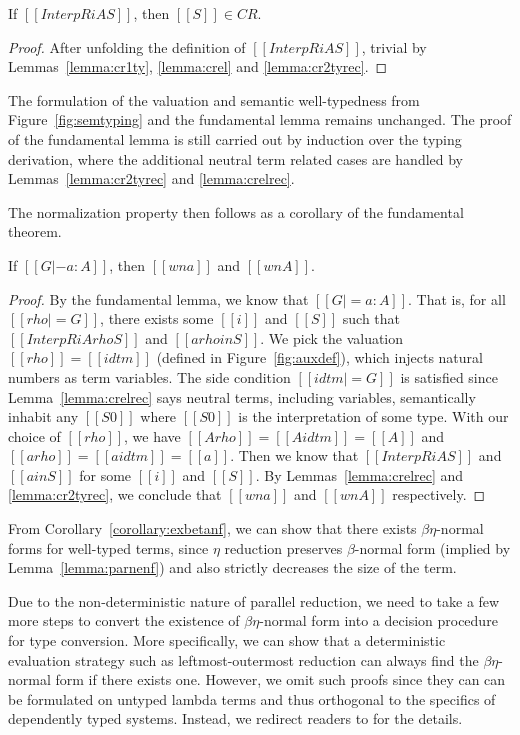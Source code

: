 \documentclass[acmsmall]{acmart}
\begin{document}
\begin{lemma}
  \label{lemma:crelrec}
  If $[[InterpR i A S]]$, then $[[S]] \in CR$.
\end{lemma}
\begin{proof}
  After unfolding the definition of $[[InterpR i A S]]$, trivial by
  Lemmas~\ref{lemma:cr1ty}, \ref{lemma:crel} and \ref{lemma:cr2tyrec}.
\end{proof}

The formulation of the valuation and semantic well-typedness from
Figure~\ref{fig:semtyping} and the fundamental lemma remains
unchanged.
The proof of the fundamental lemma is still carried out by induction
over the typing derivation, where the additional neutral term related
cases are handled by Lemmas~\ref{lemma:cr2tyrec} and
\ref{lemma:crelrec}.

The normalization property then follows as a corollary of the
fundamental theorem.
\begin{corollary}
  \label{corollary:exbetanf}
  If $[[G |- a : A]]$, then $[[wn a]]$ and $[[wn A]]$.
\end{corollary}
\begin{proof}
  By the fundamental lemma, we know that $[[G |= a : A]]$. That is,
  for all $[[rho |= G]]$, there exists some $[[i]]$ and $[[S]]$ such
  that $[[InterpR i A {rho} S]]$ and $[[a {rho} in S]]$.
  We pick the valuation $[[rho]] = [[idtm]]$ (defined in Figure~\ref{fig:auxdef}), which injects
  natural numbers as term variables. The side condition $[[idtm |=
  G]]$ is satisfied since Lemma~\ref{lemma:crelrec} says neutral terms,
  including variables, semantically inhabit any $[[S0]]$ where
  $[[S0]]$ is the interpretation of some type. With our choice of
  $[[rho]]$, we have $[[A {rho}]] = [[A {idtm}]] = [[A]]$ and $[[a {rho}]] = [[a{idtm}]] = [[a]]$. Then we
  know that $[[InterpR i A S]]$ and $[[a in S]]$ for some $[[i]]$ and
  $[[S]]$. By Lemmas~\ref{lemma:crelrec} and \ref{lemma:cr2tyrec}, we
  conclude that $[[wn a]]$ and $[[wn A]]$ respectively.
\end{proof}
From Corollary~\ref{corollary:exbetanf}, we can show that there exists
$\beta\eta$-normal forms for well-typed terms, since $\eta$ reduction
preserves $\beta$-normal form (implied by Lemma~\ref{lemma:parnenf})
and also strictly decreases the size of the term.

Due to the non-deterministic nature of parallel reduction, we need to
take a few more steps to convert the existence of $\beta\eta$-normal
form into a decision procedure for type conversion. More specifically,
we can show that a deterministic evaluation strategy such as
leftmost-outermost reduction can always find the $\beta\eta$-normal
form if there exists one. However, we omit such proofs since they can
can be formulated on untyped lambda terms and thus orthogonal to the
specifics of dependently typed systems. Instead, we redirect readers
to \citet{factorization-essentially, takahashi-parallel-reduction} for
the details.
\end{document}
